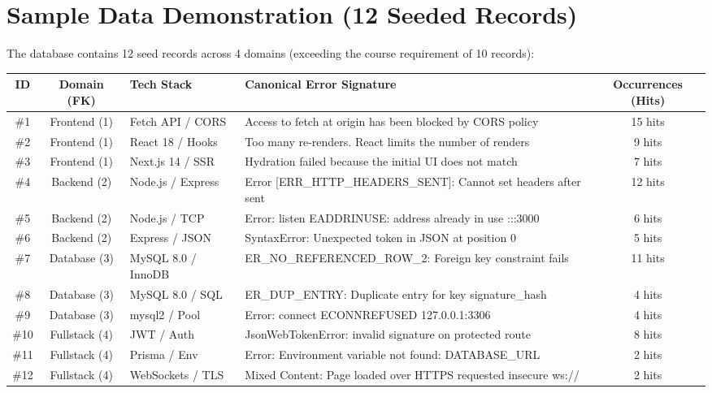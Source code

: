 \documentclass[10pt,a4paper]{article}
\begin{document}
\section{Sample Data Demonstration (12 Seeded Records)}
The database contains 12 seed records across 4 domains (exceeding the course requirement of 10 records):
\begin{center}
\scriptsize
\begin{tabular}{ccllc}
\toprule
\textbf{ID} & \textbf{Domain (FK)} & \textbf{Tech Stack} & \textbf{Canonical Error Signature} & \textbf{Occurrences (Hits)} \\
\midrule
\#1 & Frontend (1) & Fetch API / CORS & Access to fetch at origin has been blocked by CORS policy & 15 hits \\
\#2 & Frontend (1) & React 18 / Hooks & Too many re-renders. React limits the number of renders & 9 hits \\
\#3 & Frontend (1) & Next.js 14 / SSR & Hydration failed because the initial UI does not match & 7 hits \\
\#4 & Backend (2) & Node.js / Express & Error [ERR\_HTTP\_HEADERS\_SENT]: Cannot set headers after sent & 12 hits \\
\#5 & Backend (2) & Node.js / TCP & Error: listen EADDRINUSE: address already in use :::3000 & 6 hits \\
\#6 & Backend (2) & Express / JSON & SyntaxError: Unexpected token in JSON at position 0 & 5 hits \\
\#7 & Database (3) & MySQL 8.0 / InnoDB & ER\_NO\_REFERENCED\_ROW\_2: Foreign key constraint fails & 11 hits \\
\#8 & Database (3) & MySQL 8.0 / SQL & ER\_DUP\_ENTRY: Duplicate entry for key signature\_hash & 4 hits \\
\#9 & Database (3) & mysql2 / Pool & Error: connect ECONNREFUSED 127.0.0.1:3306 & 4 hits \\
\#10 & Fullstack (4) & JWT / Auth & JsonWebTokenError: invalid signature on protected route & 8 hits \\
\#11 & Fullstack (4) & Prisma / Env & Error: Environment variable not found: DATABASE\_URL & 2 hits \\
\#12 & Fullstack (4) & WebSockets / TLS & Mixed Content: Page loaded over HTTPS requested insecure ws:// & 2 hits \\
\bottomrule
\end{tabular}
\end{center}

\newpage
\end{document}
